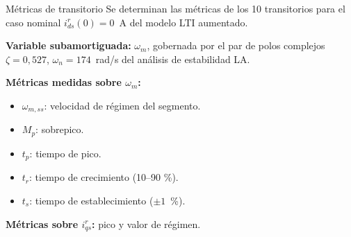 \documentclass[aspectratio=169,t]{beamer}
\begin{document}
\begin{frame}{Métricas de transitorio}
{\small\color{uncGray}Se determinan las métricas de los 10 transitorios para el caso nominal $i_{ds}^{r}(0)=0$~A del modelo LTI aumentado.}\par
\vspace{4mm}

\textbf{Variable subamortiguada:} $\omega_m$, gobernada por el par de polos complejos $\zeta=0{,}527$, $\omega_n=174$~rad/s del análisis de estabilidad LA.

\textbf{Métricas medidas sobre $\omega_m$:}
\begin{itemize}
\item $\omega_{m,ss}$: velocidad de régimen del segmento.
\item $M_p$: sobrepico.
\item $t_p$: tiempo de pico.
\item $t_r$: tiempo de crecimiento (10--90 \%).
\item $t_s$: tiempo de establecimiento ($\pm 1$~\%).
\end{itemize}

\textbf{Métricas sobre $i_{qs}^r$:} pico y valor de régimen.

\end{frame}
\end{document}
